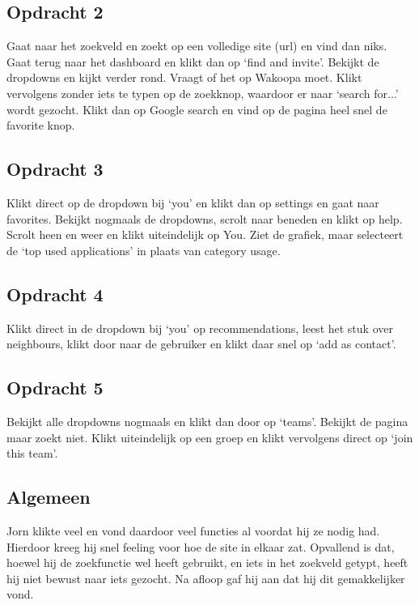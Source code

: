 \subsection{Opdracht 2}
Gaat naar het zoekveld en zoekt op een volledige site (url) en vind dan niks. Gaat terug naar het dashboard en klikt dan op `find and invite'. Bekijkt de dropdowns en kijkt verder rond. Vraagt of het op Wakoopa moet. Klikt vervolgens zonder iets te typen op de zoekknop, waardoor er naar `search for...' wordt gezocht. Klikt dan op Google search en vind op de pagina heel snel de favorite knop.

\subsection{Opdracht 3}
Klikt direct op de dropdown bij `you' en klikt dan op settings en gaat naar favorites. Bekijkt nogmaals de dropdowns, scrolt naar beneden en klikt op help. Scrolt heen en weer en klikt uiteindelijk op You. Ziet de grafiek, maar selecteert de `top used applications' in plaats van category usage.

\subsection{Opdracht 4}
Klikt direct in de dropdown bij `you' op recommendations, leest het stuk over neighbours, klikt door naar de gebruiker en klikt daar snel op `add as contact'.

\subsection{Opdracht 5}
Bekijkt alle dropdowns nogmaals en klikt dan door op `teams'. Bekijkt de pagina maar zoekt niet. Klikt uiteindelijk op een groep en klikt vervolgens direct op `join this team'.

\subsection{Algemeen}
Jorn klikte veel en vond daardoor veel functies al voordat hij ze nodig had. Hierdoor kreeg hij snel feeling voor hoe de site in elkaar zat. Opvallend is dat, hoewel hij de zoekfunctie wel heeft gebruikt, en iets in het zoekveld getypt, heeft hij niet bewust naar iets gezocht. Na afloop gaf hij aan dat hij dit gemakkelijker vond.

